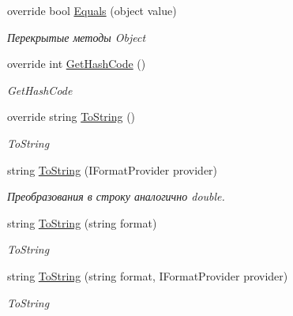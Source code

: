 \begin{DoxyCompactItemize}
override bool \mbox{\hyperlink{struct_f_b_a_1_1_money_a4bbc7b4bae072442b208b68fb035d5fd}{Equals}} (object value)
\begin{DoxyCompactList}\small\item\em Перекрытые методы Object \end{DoxyCompactList}\item 
override int \mbox{\hyperlink{struct_f_b_a_1_1_money_af2d64ddd64795af6f7730ad20258d54a}{Get\+Hash\+Code}} ()
\begin{DoxyCompactList}\small\item\em Get\+Hash\+Code \end{DoxyCompactList}\item 
override string \mbox{\hyperlink{struct_f_b_a_1_1_money_ab9c812a1c7ddd8496bbea4192f1e8ce2}{To\+String}} ()
\begin{DoxyCompactList}\small\item\em To\+String \end{DoxyCompactList}\item 
string \mbox{\hyperlink{struct_f_b_a_1_1_money_a38711699bdc67a8203f6f3861acfe325}{To\+String}} (I\+Format\+Provider provider)
\begin{DoxyCompactList}\small\item\em Преобразования в строку аналогично double. \end{DoxyCompactList}\item 
string \mbox{\hyperlink{struct_f_b_a_1_1_money_ab246a3547382e0df4bdbf2ae08bc9adb}{To\+String}} (string format)
\begin{DoxyCompactList}\small\item\em To\+String \end{DoxyCompactList}\item 
string \mbox{\hyperlink{struct_f_b_a_1_1_money_aebcac29699bcc1143675ab8f238ab672}{To\+String}} (string format, I\+Format\+Provider provider)
\begin{DoxyCompactList}\small\item\em To\+String \end{DoxyCompactList}\end{DoxyCompactItemize}
